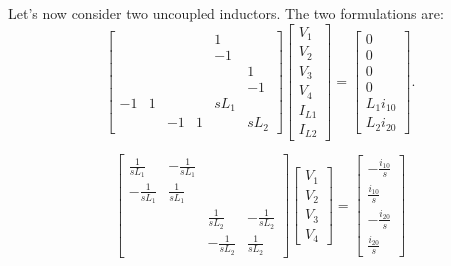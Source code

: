 \documentclass[a4paper, 12pt]{article}
\begin{document}
Let's now consider two uncoupled inductors.  The two formulations are:
%
\begin{equation}
  \begin{bmatrix}
     &  &  &    &  1 & \\
     &  &  &    & -1 & \\
     &  &  &    &    & 1\\
     &  &  &    &    & -1\\
-1 & 1  &  &    & sL_1 & \\
     &  & -1 & 1 &  & sL_2
  \end{bmatrix}
  \begin{bmatrix}
    V_1 \\ V_2 \\ V_3 \\ V_4 \\ I_{L1} \\ I_{L2}
  \end{bmatrix}
=
\begin{bmatrix}
  0 \\ 0 \\ 0 \\ 0 \\ L_1 i_{10} \\ L_2 i_{20}
\end{bmatrix}.
\label{eqn:L1L2_stamp1}
\end{equation}


\begin{equation}
  \begin{bmatrix}
    \frac{1}{sL_1} & -\frac{1}{sL_1} &   & \\
   -\frac{1}{sL_1} & \frac{1}{sL_1}  &   & \\
   & &  \frac{1}{sL_2} & -\frac{1}{sL_2}   \\
   & & -\frac{1}{sL_2} & \frac{1}{sL_2}  
  \end{bmatrix}
  \begin{bmatrix}
    V_1 \\ V_2 \\ V_3 \\ V_4
  \end{bmatrix}
=
\begin{bmatrix}
  -\frac{i_{10}}{s} \\ \frac{i_{10}}{s} \\
  -\frac{i_{20}}{s} \\ \frac{i_{20}}{s}
\end{bmatrix}
\label{eqn:L1L2_stamp2}
\end{equation}
\end{document}
